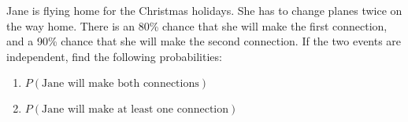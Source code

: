 \begin{puzzle}
    Jane is flying home for the Christmas holidays. She has to change planes twice on the way home. There is an 80\% chance that she will make the first connection, and a 90\% chance that she will make the second connection. If the two events are independent, find the following probabilities:
    \begin{enumerate}
        \item \( P(\text{Jane will make both connections}) \)
        \item \( P(\text{Jane will make at least one connection}) \)
    \end{enumerate}
\end{puzzle}
